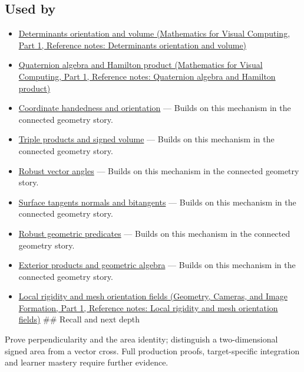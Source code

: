 \subsection{Used by}\label{appendix-2391db8052b1-used-by}

\hypertarget{appendix-2391db8052b1-used-by}{}

\begin{itemize}
\item
  \href{../02-Mathematics-for-Visual-Computing-P01/main.pdf\#appendix-da478be01d02}{Determinants orientation and volume (Mathematics for Visual Computing, Part 1, Reference notes: Determinants orientation and volume)}
\item
  \href{../02-Mathematics-for-Visual-Computing-P01/main.pdf\#appendix-965d9260eeab}{Quaternion algebra and Hamilton product (Mathematics for Visual Computing, Part 1, Reference notes: Quaternion algebra and Hamilton product)}
\item
  \hyperref[appendix-87d7626c8d37]{Coordinate handedness and orientation} --- Builds on this mechanism in the connected geometry story.
\item
  \hyperref[appendix-5caa058bd9c7]{Triple products and signed volume} --- Builds on this mechanism in the connected geometry story.
\item
  \hyperref[appendix-e569e60e18e6]{Robust vector angles} --- Builds on this mechanism in the connected geometry story.
\item
  \hyperref[appendix-e31893dec985]{Surface tangents normals and bitangents} --- Builds on this mechanism in the connected geometry story.
\item
  \hyperref[appendix-341296fb3f64]{Robust geometric predicates} --- Builds on this mechanism in the connected geometry story.
\item
  \hyperref[appendix-e1960925d1b8]{Exterior products and geometric algebra} --- Builds on this mechanism in the connected geometry story.
\item
  \href{../03-Geometry-Cameras-and-Image-Formation-P01/main.pdf\#appendix-7107009c505b}{Local rigidity and mesh orientation fields (Geometry, Cameras, and Image Formation, Part 1, Reference notes: Local rigidity and mesh orientation fields)} \#\# Recall and next depth
\end{itemize}

Prove perpendicularity and the area identity; distinguish a two-dimensional signed area from a vector cross. Full production proofs, target-specific integration and learner mastery require further evidence.


